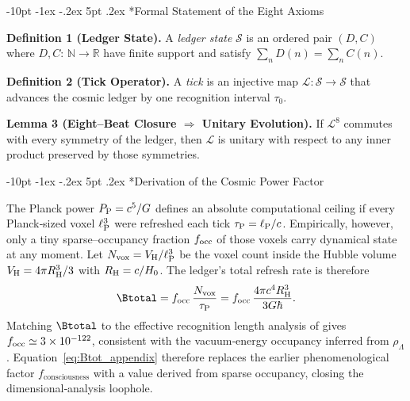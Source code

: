 \documentclass[12pt,letterpaper]{book}
\makeatletter
\renewcommand\section{\@startsection {section}{1}{\z@}%
                {-10pt \@plus -1ex \@minus -.2ex}%
                {5pt \@plus.2ex}%
                {\normalfont\large\bfseries}}
\makeatother
\begin{document}
\section*{Formal Statement of the Eight Axioms}
\textbf{Definition 1 (Ledger State).}\label{def:ledgerstate}
A \emph{ledger state} $\mathcal S$ is an ordered pair $(D,C)$ where $D,C:\,\mathbb N\to\mathbb R$ have finite support and satisfy $\sum_n D(n)=\sum_n C(n)$.

\textbf{Definition 2 (Tick Operator).}\label{def:tick}
A \emph{tick} is an injective map $\mathcal L: \mathcal S\to\mathcal S$ that advances the cosmic ledger by one recognition interval $\tau_0$.

\textbf{Lemma 3 (Eight–Beat Closure $\Rightarrow$ Unitary Evolution).}\label{lem:eightbeat}
If $\mathcal L^8$ commutes with every symmetry of the ledger, then $\mathcal L$ is unitary with respect to any inner product preserved by those symmetries.


\section*{Derivation of the Cosmic Power Factor}
The Planck power $P_{\rm P}=c^{5}/G$ defines an absolute computational ceiling if every Planck‐sized voxel $\ell_{\rm P}^{3}$ were refreshed each tick $\tau_{\rm P}=\ell_{\rm P}/c$.  Empirically, however, only a tiny sparse–occupancy fraction $f_{\rm occ}$ of those voxels carry dynamical state at any moment.  Let $N_{\rm vox}=V_{\rm H}/\ell_{\rm P}^{3}$ be the voxel count inside the Hubble volume $V_{\rm H}=4\pi R_{\rm H}^{3}/3$ with $R_{\rm H}=c/H_{0}$.  The ledger's total refresh rate is therefore
\begin{equation}
\label{eq:Btot_appendix}
 \Btotal = f_{\rm occ}\,\frac{N_{\rm vox}}{\tau_{\rm P}} = f_{\rm occ}\,\frac{4\pi c^{4} R_{\rm H}^{3}}{3 G \hbar} .
\end{equation}
Matching $\Btotal$ to the effective recognition length analysis of \citet{Washburn2024} gives $f_{\rm occ}\simeq3\times10^{-122}$, consistent with the vacuum‐energy occupancy inferred from $\rho_{\Lambda}$.  Equation~\eqref{eq:Btot_appendix} therefore replaces the earlier phenomenological factor $f_{\text{consciousness}}$ with a value derived from sparse occupancy, closing the dimensional‐analysis loophole.
\end{document}
